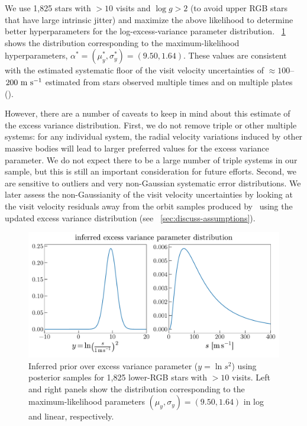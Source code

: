 \documentclass[modern, letterpaper]{aastex62}
\newcommand{\thejoker}{\project{The~Joker}}
\newcommand{\logg}{\ensuremath{\log g}}
\begin{document}
We use 1,825 stars with $>10$ visits and $\logg > 2$ (to avoid upper RGB stars
that have large intrinsic jitter) and maximize the above likelihood to determine
better hyperparameters for the log-excess-variance parameter distribution.
\figurename~\ref{fig:infer-jitter} shows the distribution corresponding to the
maximum-likelihood hyperparameters, $\alpha^* = (\mu_y^*, \sigma_y^*) = (9.50,
1.64)$.
These values are consistent with the estimated systematic floor of the visit
velocity uncertainties of $\approx 100$--$200~\mathrm{m}~\mathrm{s}^{-1}$ estimated from stars
observed multiple times and on multiple plates (\citealt{Nidever:2015}).

However, there are a number of caveats to keep in mind about this estimate of
the excess variance distribution.
First, we do not remove triple or other multiple systems: for any individual
system, the radial velocity variations induced by other massive bodies will lead
to larger preferred values for the excess variance parameter.
We do not expect there to be a large number of triple systems in our sample, but
this is still an important consideration for future efforts.
Second, we are sensitive to outliers and very non-Gaussian systematic error
distributions.
We later assess the non-Gaussianity of the visit velocity uncertainties by
looking at the visit velocity residuals away from the orbit samples produced by
\thejoker\ using the updated excess variance distribution (see
\sectionname~\ref{sec:discuss-assumptions}).

\begin{figure}[h]
\begin{center}
\includegraphics[width=\textwidth]{infer-jitter}
\end{center}
\caption{%
Inferred prior over excess variance parameter ($y = \ln s^2$) using posterior
samples for 1,825 lower-RGB stars with $>10$ visits.
Left and right panels show the distribution corresponding to the
maximum-likelihood parameters $(\mu_y, \sigma_y) = (9.50, 1.64)$ in log and
linear, respectively.
\label{fig:infer-jitter}
}
\end{figure}
\end{document}
